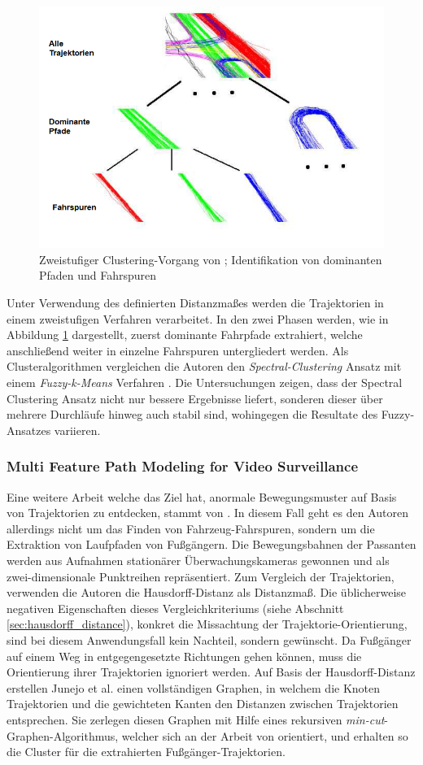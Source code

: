 \begin{figure}[H]
    \centering
    \includegraphics[width=0.5\linewidth]{resources/img/RelatedWork/Fu_HierarchicalClustering}
    \caption[Zweistufiger Clustering-Vorgang von Hu et al.]
            {Zweistufiger Clustering-Vorgang von \cite[]{Hu2005}; Identifikation von dominanten Pfaden und Fahrspuren}
    \label{fig:relw_hu_two_step_cluster}
\end{figure}

Unter Verwendung des definierten Distanzmaßes werden die Trajektorien in einem zweistufigen Verfahren verarbeitet.
In den zwei Phasen werden, wie in Abbildung \ref{fig:relw_hu_two_step_cluster} dargestellt, zuerst dominante
Fahrpfade extrahiert, welche anschließend weiter in einzelne Fahrspuren untergliedert werden.
Als Clusteralgorithmen vergleichen die Autoren den \textit{Spectral-Clustering} Ansatz \cite[]{Ng2002}
mit einem \textit{Fuzzy-k-Means} Verfahren \cite[]{xie1991validity}.
Die Untersuchungen zeigen, dass der Spectral Clustering Ansatz nicht nur bessere Ergebnisse liefert, sonderen dieser
über mehrere Durchläufe hinweg auch stabil sind, wohingegen die Resultate des Fuzzy-Ansatzes variieren.


\subsubsection*{Multi Feature Path Modeling for Video Surveillance}
Eine weitere Arbeit welche das Ziel hat, anormale Bewegungsmuster auf Basis von Trajektorien zu entdecken,
stammt von \cite[]{Junejo2004}. In diesem Fall geht es den Autoren allerdings nicht um das Finden von Fahrzeug-Fahrspuren,
sondern um die Extraktion von Laufpfaden von Fußgängern.
Die Bewegungsbahnen der Passanten werden aus Aufnahmen stationärer Überwachungskameras gewonnen und
als zwei-dimensionale Punktreihen repräsentiert.
Zum Vergleich der Trajektorien, verwenden die Autoren die Hausdorff-Distanz als Distanzmaß.
Die üblicherweise negativen Eigenschaften dieses
Vergleichkriteriums (siehe Abschnitt \ref{sec:hausdorff_distance}), konkret die Missachtung der
Trajektorie-Orientierung, sind bei diesem Anwendungsfall kein Nachteil, sondern gewünscht.
Da Fußgänger auf einem Weg in entgegengesetzte Richtungen gehen können, muss die Orientierung
ihrer Trajektorien ignoriert werden.
Auf Basis der Hausdorff-Distanz erstellen Junejo et al. einen vollständigen Graphen, in welchem die Knoten Trajektorien
und die gewichteten Kanten den Distanzen zwischen Trajektorien entsprechen.
Sie zerlegen diesen Graphen mit Hilfe eines rekursiven \textit{min-cut}-Graphen-Algorithmus, welcher sich
an der Arbeit von \cite[]{boykov2004experimental} orientiert, und erhalten so die Cluster für die
extrahierten Fußgänger-Trajektorien.

